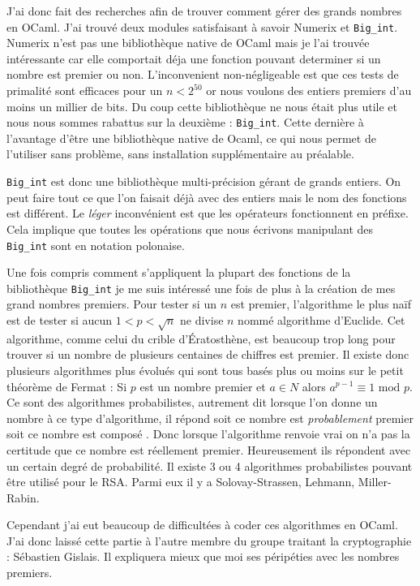 \documentclass[a4paper,12pt]{article}
\begin{document}
J'ai donc fait des recherches afin de trouver comment gérer des grands nombres en OCaml. J'ai trouvé deux modules satisfaisant à savoir Numerix et \texttt{Big\_int}. Numerix n'est pas une bibliothèque native de OCaml mais je l'ai trouvée intéressante car elle comportait déja une fonction pouvant determiner si un nombre est premier ou non. L'inconvenient non-négligeable est que ces tests de primalité sont efficaces pour un $n < 2^{50}$ or nous voulons des entiers premiers d'au moins un millier de bits. Du coup cette bibliothèque ne nous était plus utile et nous nous sommes rabattus sur la deuxième : \texttt{Big\_int}. Cette dernière à l'avantage d'être une bibliothèque native de Ocaml, ce qui nous permet de l'utiliser sans problème, sans installation supplémentaire au préalable.

\texttt{Big\_int} est donc une bibliothèque multi-précision gérant de grands entiers. On peut faire tout ce que l'on faisait déjà avec des entiers mais le nom des fonctions est différent. Le \emph{léger} inconvénient est que les opérateurs fonctionnent en préfixe. Cela implique que toutes les opérations que nous écrivons manipulant des \texttt{Big\_int} sont en notation polonaise.

Une fois compris comment s'appliquent la plupart des fonctions de la bibliothèque \texttt{Big\_int} je me suis intéressé une fois de plus à la création de mes grand nombres premiers. Pour tester si un $n$ est premier, l'algorithme le plus naïf est de tester si aucun $1 < p < \sqrt{n}$ ne divise $n$ nommé algorithme d'Euclide. Cet algorithme, comme celui  du crible d'Ératosthène, est beaucoup trop long pour trouver si un nombre de plusieurs centaines de chiffres est premier. Il existe donc plusieurs algorithmes plus évolués qui sont tous basés plus ou moins sur le petit théorème de Fermat : Si $p$ est un nombre premier et $a \in N $ alors $a^{p - 1} \equiv 1 \textrm{ mod } p$. Ce sont des algorithmes probabilistes, autrement dit lorsque l'on donne un nombre à ce type d'algorithme, il répond soit \og ce nombre est \emph{probablement} premier \fg{} soit \og ce nombre est composé \fg{}. Donc lorsque l'algorithme renvoie vrai on n'a pas la certitude que ce nombre est réellement premier. Heureusement ils répondent avec un certain degré de probabilité. Il existe 3 ou 4 algorithmes probabilistes pouvant être utilisé pour le RSA. Parmi eux il y a Solovay-Strassen, Lehmann, Miller-Rabin.

Cependant j'ai eut beaucoup de difficultées à coder ces algorithmes en OCaml. J'ai donc laissé cette partie à l'autre membre du groupe traitant la cryptographie : Sébastien Gislais. Il expliquera mieux que moi ses péripéties avec les nombres premiers.
\end{document}
